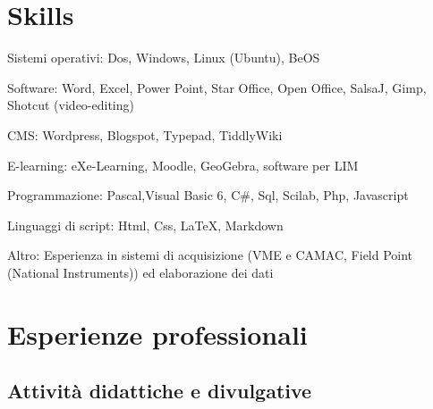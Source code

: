 \section{Skills}

\begin{CV}
	
	\item[Sistemi operativi:] Dos, Windows, Linux (Ubuntu), BeOS
	\item[Software:] Word, Excel, Power Point, Star Office, Open Office, SalsaJ, Gimp, Shotcut (video-editing)
	\item[CMS:] Wordpress, Blogspot, Typepad, TiddlyWiki
	\item[E-learning:] eXe-Learning, Moodle, GeoGebra, software per LIM
	\item[Programmazione:] Pascal,Visual Basic 6, C\#, Sql, Scilab, Php, Javascript
	\item[Linguaggi di script:] Html, Css, \LaTeX, Markdown
	\item[Altro:] Esperienza in sistemi di acquisizione (VME e CAMAC, Field Point (National Instruments)) ed elaborazione dei dati
	
\end{CV}

\section{Esperienze professionali}
\subsection*{Attivit\`a didattiche e divulgative}

